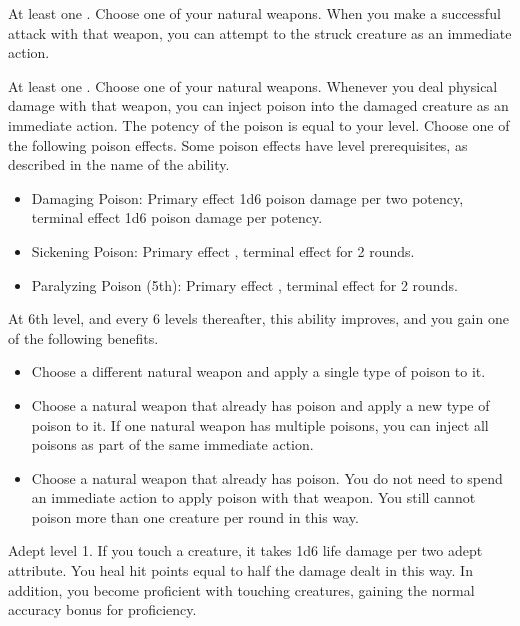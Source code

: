     \featpre At least one .
    \featben Choose one of your natural weapons.
    When you make a successful attack with that weapon, you can attempt to  the struck creature as an immediate action.

    \featpre At least one .
    \featben Choose one of your natural weapons.
    Whenever you deal physical damage with that weapon, you can inject poison into the damaged creature as an immediate action.
    The potency of the poison is equal to your level.
    Choose one of the following poison effects.
    Some poison effects have level prerequisites, as described in the name of the ability.
    \begin{itemize}
        \item Damaging Poison: Primary effect 1d6 poison damage per two potency, terminal effect 1d6 poison damage per potency.
        \item Sickening Poison: Primary effect \sickened, terminal effect \nauseated for 2 rounds.
        \item Paralyzing Poison (5th): Primary effect \immobilized, terminal effect \paralyzed for 2 rounds.
    \end{itemize}

    At 6th level, and every 6 levels thereafter, this ability improves, and you gain one of the following benefits.
    \begin{itemize}
        \item Choose a different natural weapon and apply a single type of poison to it.
        \item Choose a natural weapon that already has poison and apply a new type of poison to it.
            If one natural weapon has multiple poisons, you can inject all poisons as part of the same immediate action.
        \item Choose a natural weapon that already has poison.
            You do not need to spend an immediate action to apply poison with that weapon.
            You still cannot poison more than one creature per round in this way.
    \end{itemize}

    \featpre Adept level 1.
    \featben If you touch a creature, it takes 1d6 life damage  per two adept attribute.
    You heal hit points equal to half the damage dealt in this way.
    In addition, you become proficient with touching creatures, gaining the normal  accuracy bonus for proficiency.

